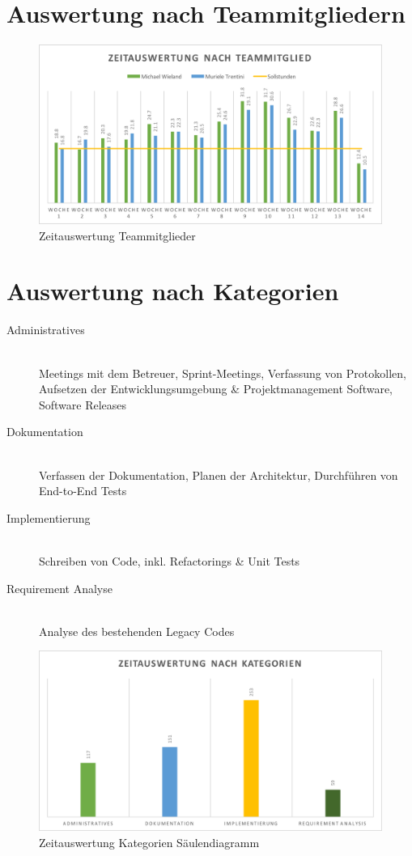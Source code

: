 \documentclass[11pt,a4paper,english,oneside]{book}
\numberwithin{equation}{chapter}
\begin{document}
	\section{Auswertung nach Teammitgliedern}
	\begin{figure}[h!]
		\centering
		\includegraphics[width=\linewidth]{assets/images/zeitauswertung-team}
		\caption{Zeitauswertung Teammitglieder}
		\label{zeitauswertung-team}
	\end{figure}
	
	\section{Auswertung nach Kategorien}
	\begin{description}
		\item[Administratives] \hfill \\ 
		Meetings mit dem Betreuer, Sprint-Meetings, Verfassung von Protokollen, Aufsetzen der Entwicklungsumgebung \& Projektmanagement Software, Software Releases
		\item[Dokumentation] \hfill \\ 
		Verfassen der Dokumentation, Planen der Architektur, Durchführen von End-to-End Tests
		\item[Implementierung] \hfill \\ 
		Schreiben von Code, inkl. Refactorings \& Unit Tests
		\item[Requirement Analyse] \hfill \\ 
		Analyse des bestehenden Legacy Codes
	\end{description}
	\begin{figure}[h!]
		\centering
		\includegraphics[width=\linewidth]{assets/images/zeitauswertung-kat}
		\caption{Zeitauswertung Kategorien Säulendiagramm}
		\label{zeitauswertung-kategorien}
	\end{figure}
	
\end{document}
